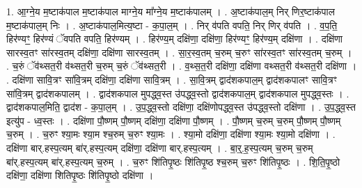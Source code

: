 \documentclass[17pt]{extarticle}
\begin{document}
1. आ॒ग्ने॒य म॒ष्टाक॑पाल म॒ष्टाक॑पाल माग्ने॒य मा᳚ग्ने॒य म॒ष्टाक॑पालम् । . अ॒ष्टाक॑पाल॒म् निर् णिर॒ष्टाक॑पाल म॒ष्टाक॑पाल॒म् निः । . अ॒ष्टाक॑पाल॒मित्य॒ष्टा - क॒पा॒ल॒म् । . निर् व॑पति वपति॒ निर् णिर् व॑पति । . व॒प॒ति॒ हिर॑ण्यꣳ॒॒ हिर॑ण्यं ॅवपति वपति॒ हिर॑ण्यम् । . हिर॑ण्य॒म् दक्षि॑णा॒ दक्षि॑णा॒ हिर॑ण्यꣳ॒॒ हिर॑ण्य॒म् दक्षि॑णा । . दक्षि॑णा सारस्व॒तꣳ सा॑रस्व॒तम् दक्षि॑णा॒ दक्षि॑णा सारस्व॒तम् । . सा॒र॒स्व॒तम् च॒रुम् च॒रुꣳ सा॑रस्व॒तꣳ सा॑रस्व॒तम् च॒रुम् । . च॒रुं ॅव॑थ्सत॒री व॑थ्सत॒री च॒रुम् च॒रुं ॅव॑थ्सत॒री । . व॒थ्स॒त॒री दक्षि॑णा॒ दक्षि॑णा वथ्सत॒री व॑थ्सत॒री दक्षि॑णा । . दक्षि॑णा सावि॒त्रꣳ सा॑वि॒त्रम् दक्षि॑णा॒ दक्षि॑णा सावि॒त्रम् । . सा॒वि॒त्रम् द्वाद॑शकपाल॒म् द्वाद॑शकपालꣳ सावि॒त्रꣳ सा॑वि॒त्रम् द्वाद॑शकपालम् । . द्वाद॑शकपाल मुपद्ध्व॒स्त उ॑पद्ध्व॒स्तो द्वाद॑शकपाल॒म् द्वाद॑शकपाल मुपद्ध्व॒स्तः । . द्वाद॑शकपाल॒मिति॒ द्वाद॑श - क॒पा॒ल॒म् । . उ॒प॒द्ध्व॒स्तो दक्षि॑णा॒ दक्षि॑णोपद्ध्व॒स्त उ॑पद्ध्व॒स्तो दक्षि॑णा । . उ॒प॒द्ध्व॒स्त इत्यु॑प - ध्व॒स्तः । . दक्षि॑णा पौ॒ष्णम् पौ॒ष्णम् दक्षि॑णा॒ दक्षि॑णा पौ॒ष्णम् । . पौ॒ष्णम् च॒रुम् च॒रुम् पौ॒ष्णम् पौ॒ष्णम् च॒रुम् । . च॒रुꣳ श्या॒मः श्या॒म श्च॒रुम् च॒रुꣳ श्या॒मः । . श्या॒मो दक्षि॑णा॒ दक्षि॑णा श्या॒मः श्या॒मो दक्षि॑णा । . दक्षि॑णा बार्.हस्प॒त्यम् बा॑र्.हस्प॒त्यम् दक्षि॑णा॒ दक्षि॑णा बार्.हस्प॒त्यम् । . बा॒र्॒.ह॒स्प॒त्यम् च॒रुम् च॒रुम् बा॑र्.हस्प॒त्यम् बा॑र्.हस्प॒त्यम् च॒रुम् । . च॒रुꣳ शि॑तिपृ॒ष्ठः शि॑तिपृ॒ष्ठ श्च॒रुम् च॒रुꣳ शि॑तिपृ॒ष्ठः । . शि॒ति॒पृ॒ष्ठो दक्षि॑णा॒ दक्षि॑णा शितिपृ॒ष्ठः शि॑तिपृ॒ष्ठो दक्षि॑णा । \newline
\end{document}
